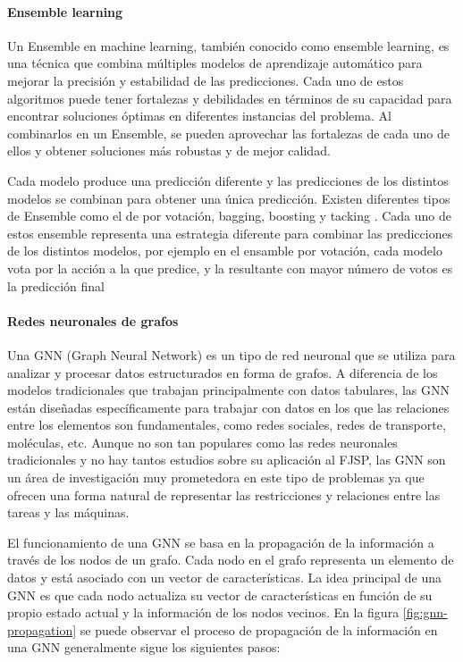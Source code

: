 \paragraph{Ensemble learning}
Un Ensemble \cite{Kundu_2023} en machine learning, también conocido como ensemble learning, es
una técnica que combina múltiples modelos de aprendizaje automático para
mejorar la precisión y estabilidad de las predicciones. Cada uno de estos
algoritmos puede tener fortalezas y debilidades en términos de su capacidad
para encontrar soluciones óptimas en diferentes instancias del problema. Al
combinarlos en un Ensemble, se pueden aprovechar las fortalezas de cada uno de
ellos y obtener soluciones más robustas y de mejor calidad.\medskip

Cada modelo produce una predicción diferente y las predicciones de los
distintos modelos se combinan para obtener una única predicción. Existen
diferentes tipos de Ensemble como el de por votación, bagging, boosting y
tacking \cite{Ensemble_Algorithms}. Cada uno de estos ensemble representa una 
estrategia diferente para combinar las predicciones de los distintos modelos, 
por ejemplo en el ensamble por votación, cada modelo vota por la acción a la 
que predice, y la resultante con mayor número de votos es la predicción final

\paragraph{Redes neuronales de grafos}
Una GNN (Graph Neural Network) \cite{pytorch-geometric} es un tipo de red
neuronal que se utiliza para analizar y procesar datos estructurados en forma
de grafos. A diferencia de los modelos tradicionales que trabajan
principalmente con datos tabulares, las GNN están diseñadas específicamente
para trabajar con datos en los que las relaciones entre los elementos son
fundamentales, como redes sociales, redes de transporte, moléculas, etc. Aunque
no son tan populares como las redes neuronales tradicionales y no hay tantos
estudios sobre su aplicación al FJSP, las GNN son un área de investigación muy
prometedora en este tipo de problemas ya que ofrecen una forma natural de
representar las restricciones y relaciones entre las tareas y las
máquinas.\medskip

El funcionamiento de una GNN se basa en la propagación de la
información\cite{Message_parrs} a través de los nodos de un grafo. Cada nodo en
el grafo representa un elemento de datos y está asociado con un vector de
características. La idea principal de una GNN es que cada nodo actualiza su
vector de características en función de su propio estado actual y la
información de los nodos vecinos. En la figura \ref{fig:gnn-propagation} se puede observar
el proceso de propagación de la información en una GNN generalmente sigue los 
siguientes pasos:

